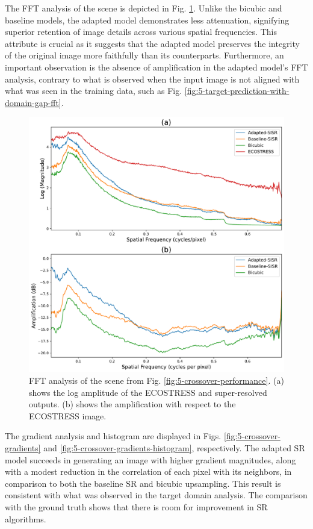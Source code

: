     The FFT analysis of the scene is depicted in Fig. \ref{fig:5-crossover-fft}. Unlike the bicubic and baseline models, the adapted model demonstrates less attenuation, signifying superior retention of image details across various spatial frequencies. This attribute is crucial as it suggests that the adapted model preserves the integrity of the original image more faithfully than its counterparts. Furthermore, an important observation is the absence of amplification in the adapted model's FFT analysis, contrary to what is observed when the input image is not aligned with what was seen in the training data, such as Fig. \ref{fig:5-target-prediction-with-domain-gap-fft}. 

    \begin{figure}[H]
        \centering
        \includegraphics[width=\textwidth]{Includes/5-crossover-performance-fft.pdf}
        \caption{FFT analysis of the scene from Fig. \ref{fig:5-crossover-performance}. (a) shows the log amplitude of the ECOSTRESS and super-resolved outputs. (b) shows the amplification with respect to the ECOSTRESS image.}
        \label{fig:5-crossover-fft}
    \end{figure}

    The gradient analysis and histogram are displayed in Figs. \ref{fig:5-crossover-gradients} and \ref{fig:5-crossover-gradients-histogram}, respectively. The adapted SR model succeeds in generating an image with higher gradient magnitudes, along with a modest reduction in the correlation of each pixel with its neighbors, in comparison to both the baseline SR and bicubic upsampling. This result is consistent with what was observed in the target domain analysis. The comparison with the ground truth shows that there is room for improvement in SR algorithms.

